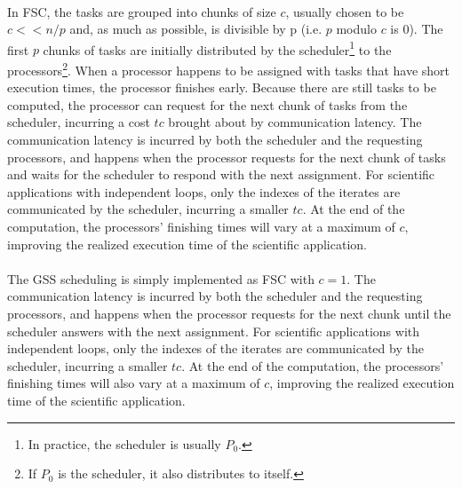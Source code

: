 \documentclass[10pt, twocolumn, letterpaper]{article}
\begin{document}
\paragraph{}
In FSC, the tasks are grouped into chunks of size $c$, usually chosen to be $c<<n/p$ and, as much as possible, is divisible by p (i.e. $p$ modulo $c$ is 0). The first $p$ chunks of tasks are initially distributed by the scheduler\footnote{In practice, the scheduler is usually $P_0$.} to the processors\footnote{If $P_0$ is the scheduler, it also distributes to itself.}. When a processor happens to be assigned with tasks that have short execution times, the processor finishes early. Because there are still tasks to be computed, the processor can request for the next chunk of tasks from the scheduler, incurring a cost $tc$ brought about by communication latency. The communication latency is incurred by both the scheduler and the requesting processors, and happens when the processor requests for the next chunk of tasks and waits for the scheduler to respond with the next assignment. For scientific applications with independent loops, only the indexes of the iterates are communicated by the scheduler, incurring a smaller $tc$. At the end of the computation, the processors’ finishing times will vary at a maximum of $c$, improving the realized execution time of the scientific application.

\paragraph{}
The GSS scheduling is simply implemented as FSC with $c=1$. The communication latency is incurred by both the scheduler and the requesting processors, and happens when the processor requests for the next chunk until the scheduler answers with the next assignment. For scientific applications with independent loops, only the indexes of the iterates are communicated by the scheduler, incurring a smaller $tc$. At the end of the computation, the processors’ finishing times will also vary at a maximum of $c$, improving the realized execution time of the scientific application.
\end{document}
